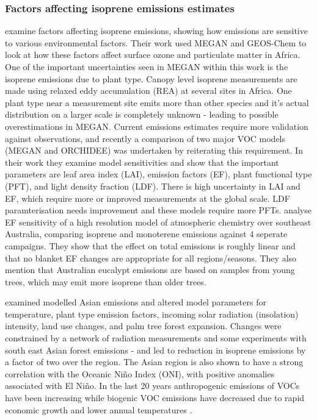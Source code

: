     \subsubsection{Factors affecting isoprene emissions estimates}
      \citet{Marais2014} examine factors affecting isoprene emissions, showing how emissions are sensitive to various environmental factors.
      Their work used MEGAN \citep{Guenther1995} and GEOS-Chem to look at how these factors affect surface ozone and particulate matter in Africa.
      One of the important uncertainties seen in MEGAN within this work is the isoprene emissions due to plant type. 
      Canopy level isoprene measurements are made using relaxed eddy accumulation (REA) at several sites in Africa.
      One plant type near a measurement site emits more than other species and it's actual distribution on a larger scale is completely unknown - leading to possible overestimations in MEGAN.
      Current emissions estimates require more validation against observations, and recently a comparison of two major VOC models (MEGAN and ORCHIDEE) was undertaken by \cite{Messina2016} reiterating this requirement.
      In their work they examine model sensitivities and show that the important parameters are leaf area index (LAI), emission factors (EF), plant functional type (PFT), and light density fraction (LDF).
      There is high uncertainty in LAI and EF, which require more or improved measurements at the global scale.
      LDF paramterisation needs improvement and these models require more PFTs.
      \cite{Emmerson2016} analyse EF sensitivity of a high resolution model of atmospheric chemistry over southeast Australia, comparing isoprene and monoterene emissions against 4 seperate campaigns.
      They show that the effect on total emissions is roughly linear and that no blanket EF changes are appropriate for all regions/seasons.
      They also mention that Australian eucalypt emissions are based on samples from young trees, which may emit more isoprene than older trees.
      
      \citet{Stavrakou2014} examined modelled Asian emissions and altered model parameters for temperature, plant type emission factors, incoming solar radiation (insolation) intensity, land use changes, and palm tree forest expansion.
      Changes were constrained by a network of radiation measurements and some experiments with south east Asian forest emissions - and led to reduction in isoprene emissions by a factor of two over the region.
      The Asian region is also shown to have a strong correlation with the Oceanic Niño Index (ONI), with positive anomalies associated with El Niño.
      In the last 20 years anthropogenic emissions of VOCs have been increasing while biogenic VOC emissions have decreased due to rapid economic growth and lower annual temperatures \citep{Stavrakou2014, Kwon2017}.
  
